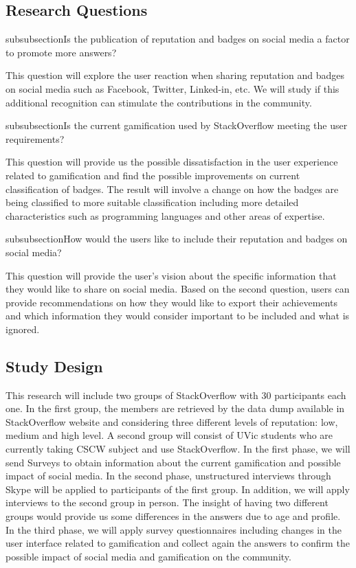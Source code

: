 \documentclass{sigchi}
\begin{document}
\subsection{Research Questions}

subsubsection{Is the publication of reputation and badges on social media a
factor to promote more answers?}

This question will explore the user reaction when sharing reputation and badges
on social media such as Facebook, Twitter, Linked-in, etc. We will study if this
additional recognition can stimulate the contributions in the community.


subsubsection{Is the current gamification used by StackOverflow meeting the
user requirements?}

This question will provide us the possible dissatisfaction in the user
experience related to gamification and find the possible improvements on
current classification of badges. The result will involve a change on how the
badges are being classified to more suitable classification including more
detailed characteristics such as programming languages and other areas of expertise.

subsubsection{How would the users like to include their reputation and badges
on social media?}

This question will provide the user’s vision about the specific information
that they would like to share on social media. Based on the second question,
users can provide recommendations on how they would like to export their
achievements and which information they would consider important to be
included and what is ignored.


\subsection{Study Design}

This research will include two groups of StackOverflow with 30 participants
each one. In the first group, the members are retrieved by the data dump
available in StackOverflow website and considering three different levels of
reputation: low, medium and high level. A second group will consist of UVic
students who are currently taking CSCW subject and use StackOverflow. In the
first phase, we will send Surveys to obtain information about the current
gamification and possible impact of social media. In the second phase,
unstructured interviews through Skype will be applied to participants of the
first group. In addition, we will apply interviews to the second group in
person. The insight of having two different groups would provide us some
differences in the answers due to age and profile. In the third phase, we will
apply survey questionnaires including changes in the user interface related to
gamification and collect again the answers to confirm the possible impact of
social media and gamification on the community.
\end{document}
